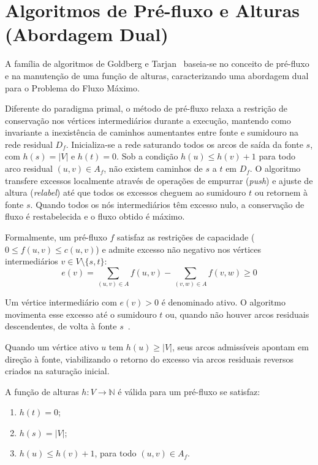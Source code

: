 \chapter{Algoritmos de Pré-fluxo e Alturas (Abordagem Dual)}\label{sec:prefluxo_alturas}
\label{sec:prefluxo}

A família de algoritmos de Goldberg e Tarjan~\cite{goldberg1988new} baseia-se no conceito de pré-fluxo e na manutenção de uma função de alturas, caracterizando uma abordagem dual para o Problema do Fluxo Máximo.

Diferente do paradigma primal, o método de pré-fluxo relaxa a restrição de conservação nos vértices intermediários durante a execução, mantendo como invariante a inexistência de caminhos aumentantes entre fonte e sumidouro na rede residual $D_f$. Inicializa-se a rede saturando todos os arcos de saída da fonte $s$, com $h(s) = |V|$ e $h(t) = 0$. Sob a condição $h(u) \le h(v) + 1$ para todo arco residual $(u,v) \in A_f$, não existem caminhos de $s$ a $t$ em $D_f$. O algoritmo transfere excessos localmente através de operações de empurrar (\textit{push}) e ajuste de altura (\textit{relabel}) até que todos os excessos cheguem ao sumidouro $t$ ou retornem à fonte $s$. Quando todos os nós intermediários têm excesso nulo, a conservação de fluxo é restabelecida e o fluxo obtido é máximo.

Formalmente, um pré-fluxo $f$ satisfaz as restrições de capacidade ($0 \le f(u,v) \le c(u,v)$) e admite excesso não negativo nos vértices intermediários $v \in V \setminus \{s, t\}$:
\begin{equation}
    e(v) = \sum_{(u,v) \in A} f(u,v) - \sum_{(v,w) \in A} f(v,w) \ge 0
\end{equation}

Um vértice intermediário com $e(v) > 0$ é denominado ativo. O algoritmo movimenta esse excesso até o sumidouro $t$ ou, quando não houver arcos residuais descendentes, de volta à fonte $s$~\cite{cook1998combinatorial}.

Quando um vértice ativo $u$ tem $h(u) \ge |V|$, seus arcos admissíveis apontam em direção à fonte, viabilizando o retorno do excesso via arcos residuais reversos criados na saturação inicial.

A função de alturas $h: V \rightarrow \mathbb{N}$ é válida para um pré-fluxo se satisfaz:
\begin{enumerate}
    \item $h(t) = 0$;
    \item $h(s) = |V|$;
    \item $h(u) \le h(v) + 1$, para todo $(u,v) \in A_f$.
\end{enumerate}

